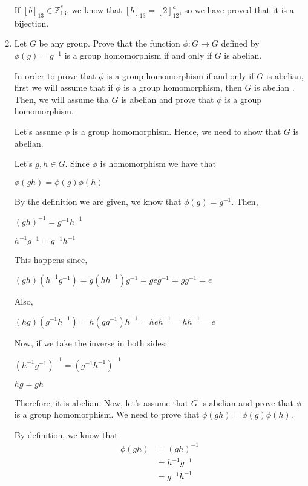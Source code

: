\documentclass[11pt]{article}
\newcommand{\Z}{\mathbb{Z}}
\begin{document}
\begin{enumerate}
If $[b]_{13}\in \Z_{13}^*$, we know that $[b]_{13}=[2]^a_{12}$, so we have proved that it is a bijection. 


\item Let $G$ be any group. Prove that the function $\phi: G \rightarrow G$ defined by 
$\phi(g) = g^{-1}$ is a group homomorphism if and only if $G$ is abelian. 

In order to prove that $\phi$ is a group homomorphism if and only if $G$ is abelian, first we will assume that if $\phi$ is a group homomorphism, then $G$ is abelian . Then, we will assume tha $G$ is abelian and prove that $\phi$ is a group homomorphism.

Let's assume $\phi$ is a group homomorphism. Hence, we need to show that $G$ is abelian. 

Let's $g,h\in G $. Since $\phi$ is homomorphism we have that 

\begin{center}
$\phi(gh)=\phi(g)\phi(h)$
\end{center}
By the definition we are given, we know that $\phi(g) = g^{-1}$. Then,
\begin{center}
$(gh)^{-1}=g^{-1}h^{-1}$
\end{center}

\begin{center}
$h^{-1}g^{-1}=g^{-1}h^{-1}$
\end{center}

This happens since,

$(gh)(h^{-1}g^{-1})=g(hh^{-1})g^{-1}=geg^{-1}=gg^{-1}=e$

Also, 

$(hg)(g^{-1}h^{-1})=h(gg^{-1})h^{-1}=heh^{-1}=hh^{-1}=e$

Now, if we take the inverse in both sides:

\begin{center}
$(h^{-1}g^{-1})^{-1}=(g^{-1}h^{-1})^{-1}$

$hg=gh$
\end{center}
Therefore, it is abelian.
Now, let's assume that $G$ is abelian and prove that $\phi$ is a group homomorphism. We need to prove that $\phi(gh)=\phi(g)\phi(h)$.

By definition, we know that 
\begin{equation}
  \begin{aligned}
    \phi(gh) &=(gh)^{-1}\\ 
    & =h^{-1}g^{-1}\\ 
    & = g^{-1}h^{-1}\\ 
    \end{aligned}
\end{equation}


\end{enumerate}
\end{document}
